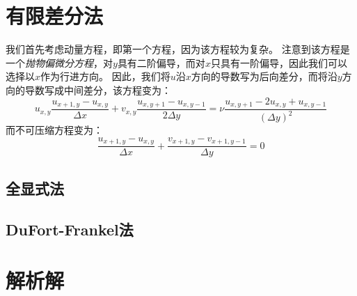 \documentclass[12pt]{ctexart}
\begin{document}
\section{有限差分法}

我们首先考虑动量方程，即第一个方程，因为该方程较为复杂。
注意到该方程是一个\emph{抛物偏微分方程}，对$y$具有二阶偏导，而对$x$只具有一阶偏导，因此我们可以选择以$x$作为行进方向。
因此，我们将$u$沿$x$方向的导数写为后向差分，而将沿$y$方向的导数写成中间差分，该方程变为：
\[ 
    u_{x,y} \frac{u_{x+1, y} - u_{x,y}}{\Delta x} + v_{x,y} \frac{u_{x,y+1} - u_{x,y-1}}{2 \Delta y} = 
    \nu \frac{u_{x,y+1} - 2 u_{x, y} + u_{x,y-1}}{(\Delta y)^2}
\]
而不可压缩方程变为：
\[ \frac{u_{x+1,y} - u_{x,y}}{\Delta x} + \frac{v_{x+1,y} - v_{x+1,y-1}}{\Delta y} = 0 \]

\subsection{全显式法}

\subsection{DuFort-Frankel法}

\section{解析解}

\printbibliography
\end{document}
